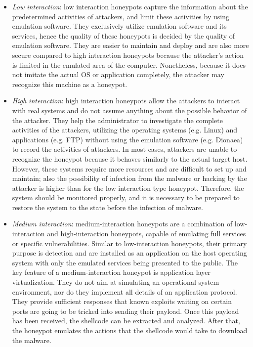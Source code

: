\documentclass[epsfig,a4paper,11pt,titlepage,oneside,openany]{book}
\begin{document}
\begin{itemize}
\item \textit{Low interaction}: low interaction honeypots capture the information about the predetermined activities of attackers, and limit these activities by using emulation software. They exclusively utilize emulation software and its services, hence the quality of these honeypots is decided by the quality of emulation software. They are easier to maintain and deploy and are also more secure compared to high interaction honeypots because the attacker’s action is limited in the emulated area of the computer. Nonetheless, because it does not imitate the actual OS or application completely, the attacker may recognize this machine as a honeypot. 

\item \textit{High interaction}: high interaction honeypots allow the attackers to interact with real systems and do not assume anything about the possible behavior of the attacker. They help the administrator to investigate the complete activities of the attackers, utilizing the operating systems (e.g. Linux) and applications (e.g. FTP) without using the emulation software (e.g. Dionaea) to record the activities of attackers. In most cases, attackers are unable to recognize the honeypot because it behaves similarly to the actual target host. However, these systems require more resources and are difficult to set up and maintain; also the possibility of infection from the malware or hacking by the attacker is higher than for the low interaction type honeypot. Therefore, the system should be monitored properly, and it is necessary to be prepared to restore the system to the state before the infection of malware.

\item \textit{Medium interaction}: medium-interaction honeypots are a combination of low-interaction and high-interaction honeypots, capable of emulating full services or specific vulnerabilities. Similar to low-interaction honeypots, their primary purpose is detection and are installed as an application on the host operating system with only the emulated services being presented to the public. The key feature of a medium-interaction honeypot is application layer virtualization. They do not aim at simulating an operational system environment, nor do they implement all details of an application protocol. They provide sufficient responses that known exploits waiting on certain ports are going to be tricked into sending their payload. Once this payload has been received, the shellcode can be extracted and analyzed. After that, the honeypot emulates the actions that the shellcode would take to download the malware.
 
\end{itemize}
\end{document}

